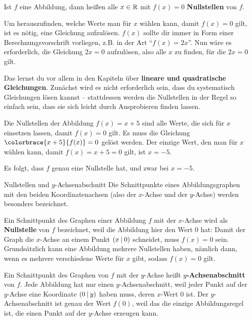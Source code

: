 \documentclass[../../main.tex]{subfiles}
\begin{document}
\begin{definition}
    Ist $f$ eine Abbildung, dann heißen alle $x\in\mathbb{R}$ mit $f(x)=0$ \textbf{Nullstellen} von $f$.
\end{definition}

Um herauszufinden, welche Werte man für $x$ wählen kann, damit $f(x)=0$ gilt, ist es nötig, eine Gleichung aufzulösen. $f(x)$ sollte dir immer in Form einer Berechnungsvorschrift vorliegen, z.B. in der Art \enquote{$f(x)=2x$}. Nun wäre es erforderlich, die Gleichung $2x=0$ aufzulösen, also alle $x$ zu finden, für die $2x=0$ gilt. 

Das lernst du vor allem in den Kapiteln über \textbf{lineare und quadratische Gleichungen}. Zunächst wird es nicht erforderlich sein, dass du systematisch Gleichungen lösen kannst -- stattdessen werden die Nullstellen in der Regel so einfach sein, dass sie sich leicht durch Ausprobieren finden lassen.

\begin{example}
    Die Nullstellen der Abbildung $f(x)=x+5$ sind alle Werte, die sich für $x$ einsetzen lassen, damit $f(x)=0$ gilt. Es muss die Gleichung $\colorbrace{x+5}{f(x)}=0$ gelöst werden. Der einzige Wert, den man für $x$ wählen kann, damit $f(x)=x+5=0$ gilt, ist $x=-5$.
    
    Es folgt, dass $f$ genau eine Nullstelle hat, und zwar bei $x=-5$.
\end{example}

\begin{nutshell}{Nullstellen und $y$-Achsenabschnitt}
    Die Schnittpunkte eines Abbildungsgraphen mit den beiden Koordinatenachsen (also der $x$-Achse und der $y$-Achse) werden besonders bezeichnet.
    
    Ein Schnittpunkt des Graphen einer Abbildung $f$ mit der $x$-Achse wird als \textbf{Nullstelle} von $f$ bezeichnet, weil die Abbildung hier den Wert 0 hat: Damit der Graph die $x$-Achse an einem Punkt $\left(x \:\middle|\: 0\right)$ schneidet, muss $f(x)=0$ sein. Grundsätzlich kann eine Abbildung mehrere Nullstellen haben, nämlich dann, wenn es mehrere verschiedene Werte für $x$ gibt, sodass $f(x)=0$ gilt.
    
    Ein Schnittpunkt des Graphen von $f$ mit der $y$-Achse heißt \textbf{$y$-Achsenabschnitt} von $f$. Jede Abbildung hat nur einen $y$-Achsenabschnitt, weil jeder Punkt auf der $y$-Achse eine Koordinate $\left(0 \:\middle|\: y\right)$ haben muss, deren $x$-Wert 0 ist. Der $y$-Achsenabschnitt ist genau der Wert $f(0)$, weil das die einzige Abbildungsregel ist, die einen Punkt auf der $y$-Achse erzeugen kann.
\end{nutshell}
\end{document}
